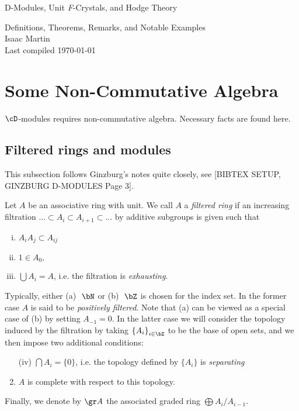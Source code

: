


\pagestyle{empty}
\begin{center}
	\Large
	\begin{LARGE}
		D-Modules, Unit \textit{F}-Crystals, and Hodge Theory \\
	\end{LARGE}
	Definitions, Theorems, Remarks, and Notable Examples \\
	Isaac Martin \\
    Last compiled \today
\end{center}
\normalsize
\vspace{-2mm}
\hru

\tableofcontents
\newpage
\section{Some Non-Commutative Algebra}
$\cD$-modules requires non-commutative algebra. Necessary facts are found here.
\subsection{Filtered rings and modules}
This subsection follows Ginzburg's notes quite closely, see [BIBTEX SETUP, GINZBURG D-MODULES Page 3]. 

\begin{defn}\label{defn:filtered-ring}
	Let $A$ be an associative ring with unit. We call $A$ a \emph{filtered ring} if an increasing filtration $... \subset A_i \subset A_{i+1} \subset ...$ by additive subgroups is given such that
	\begin{enumerate}[(i)]
		\item $A_iA_j \subset A_{ij}$
		\item $1 \in A_{0},$
		\item $\bigcup A_i = A$, i.e. the filtration is \emph{exhausting}.
	\end{enumerate}
	Typically, either (a) $~\bN$ or (b) $~\bZ$ is chosen for the index set. In the former case $A$ is said to be \emph{positively filtered}. Note that (a) can be viewed as a special case of (b) by setting $A_{-1} = 0$. In the latter case we will consider the topology induced by the filtration by taking $\left\{A_i\right\}_{i\in \bZ}$ to be the base of open sets, and we then impose two additional conditions:
	\begin{enumerate}
		\item[(iv)] $\bigcap A_i = \{0\}$, i.e. the topology defined by $\{A_i\}$ is \emph{separating}
		\item $A$ is complete with respect to this topology.
	\end{enumerate}

	\noindent Finally, we denote by $\gr A$ the associated graded ring $\bigoplus A_i / A_{i-1}$. 
\end{defn}


